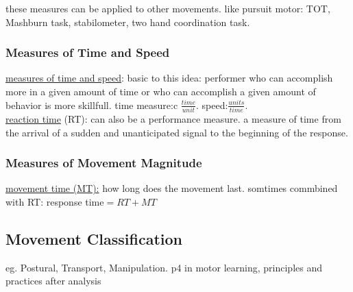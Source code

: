 these measures can be applied to other movements. like pursuit motor: TOT, Mashburn task, stabilometer, two hand coordination task.

\subsubsection{Measures of Time and Speed}
\underline{measures of time and speed}: basic to this idea: performer who can accomplish more in a given amount of time or who can accomplish a given amount of behavior is  more skillfull. time measure:c $\frac{time}{unit}$. speed:$\frac{units}{time}$.\\

\underline{reaction time} (RT): can also be a performance measure. a measure of time from the arrival of a sudden and unanticipated signal to the beginning of the response. 
\subsubsection{Measures of Movement Magnitude}
\underline{movement time (MT):} how long does the movement last. somtimes commbined with RT: response time$=RT+MT$

\subsection{Movement Classification}
eg. Postural, Transport, Manipulation. p4 in motor learning, principles and practices
\todo after analysis



